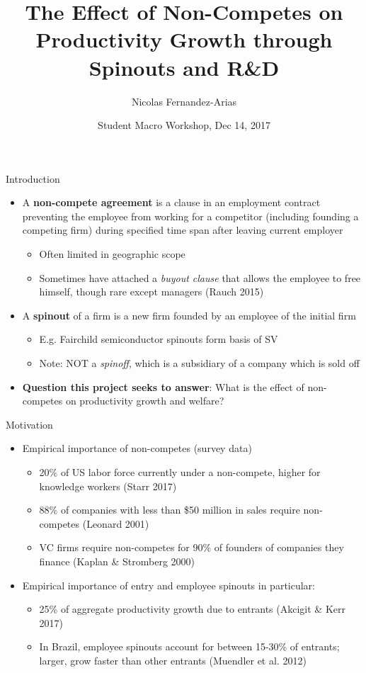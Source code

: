 \documentclass[english,usenames,dvipsnames]{beamer}
\title{The Effect of Non-Competes on Productivity Growth through Spinouts and R\&D}
\author{Nicolas Fernandez-Arias}
\date[Dec 14 2017]{Student Macro Workshop, Dec 14, 2017}
\begin{document}
	
\frame{\titlepage}

\begin{frame}{Introduction}
\label{Introduction}
\begin{itemize}
	\item A \textbf{non-compete agreement} is a clause in an employment contract preventing the employee from working for a competitor (including founding a competing firm) during specified time span after leaving current employer
	\begin{itemize}
		\item Often limited in geographic scope
		\item Sometimes have attached a \emph{buyout clause} that allows the employee to free himself, though rare except managers (Rauch 2015)
	\end{itemize}
	\item A \textbf{spinout} of a firm is a new firm founded by an employee of the initial firm
	\begin{itemize}
		\item E.g. Fairchild semiconductor spinouts form basis of SV \hyperlink{fairchild_spinouts}{}
		\item Note: NOT a \emph{spinoff}, which is a subsidiary of a company which is sold off
	\end{itemize}
	\item \textbf{Question this project seeks to answer}: What is the effect of non-competes on productivity growth and welfare?
\end{itemize}
\end{frame}

\begin{frame}{Motivation}
\label{Motivation1}
\begin{itemize}
	\item Empirical importance of non-competes (survey data)
	\begin{itemize}
		\item 20\% of US labor force currently under a non-compete, higher for knowledge workers (Starr 2017) \hyperlink{incidence_ind_oc}{} 
		\item 88\% of companies with less than \$50 million in sales require non-competes (Leonard 2001)
		\item VC firms require non-competes for 90\% of founders of companies they finance (Kaplan \& Stromberg 2000)
	\end{itemize}
	\item Empirical importance of entry and employee spinouts in particular:
	\begin{itemize}
		\item 25\% of aggregate productivity growth due to entrants (Akcigit \& Kerr 2017)
		\item In Brazil, employee spinouts account for between 15-30\% of entrants; larger, grow faster than other entrants (Muendler et al. 2012)
	\end{itemize}
\end{itemize}
\end{frame}
\end{document}
